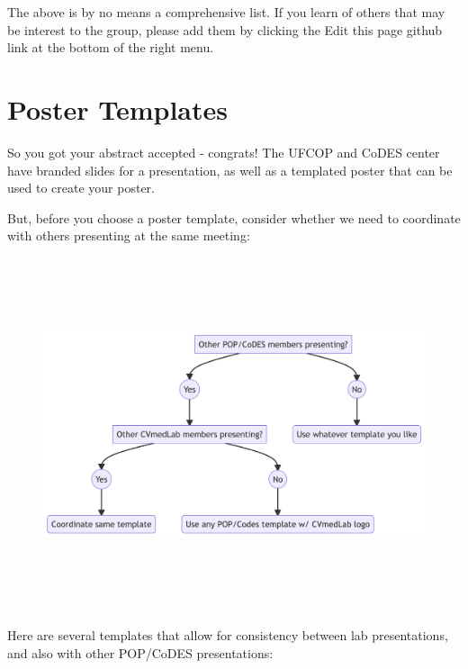 \documentclass[
  letterpaper,
  DIV=11,
  numbers=noendperiod]{scrreprt}
\begin{document}
The above is by no means a comprehensive list. If you learn of others
that may be interest to the group, please add them by clicking the Edit
this page github link at the bottom of the right menu.

\hypertarget{poster-templates}{%
\section{Poster Templates}\label{poster-templates}}

So you got your abstract accepted - congrats! The UFCOP and CoDES center
have branded slides for a presentation, as well as a templated poster
that can be used to create your poster.

But, before you choose a poster template, consider whether we need to
coordinate with others presenting at the same meeting:

\begin{figure}[H]

{\centering \includegraphics[width=7.57in,height=4.08in]{./conferences_files/figure-latex/mermaid-figure-1.png}

}

\end{figure}

Here are several templates that allow for consistency between lab
presentations, and also with other POP/CoDES presentations:
\end{document}
